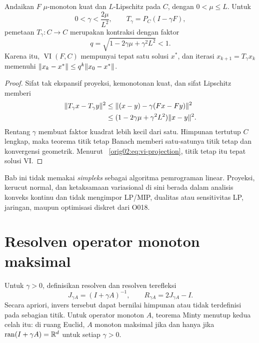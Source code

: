 \begin{theorem}
  \label{orig02:theorem:vi-contraction}
  Andaikan $F$ $\mu$-monoton kuat dan $L$-Lipschitz pada $C$, dengan
  $0<\mu\leq L$. Untuk
  \begin{equation}
    0<\gamma<\frac{2\mu}{L^2},
    \qquad
    T_\gamma=P_C(I-\gamma F),
  \end{equation}
  pemetaan $T_\gamma:C\to C$ merupakan kontraksi dengan faktor
  \begin{equation}
    \label{orig02:eq:vi-contraction-factor}
    q=\sqrt{1-2\gamma\mu+\gamma^2L^2}<1.
  \end{equation}
  Karena itu, $\operatorname{VI}(F,C)$ mempunyai tepat satu solusi $x^*$,
  dan iterasi $x_{k+1}=T_\gamma x_k$ memenuhi
  $\|x_k-x^*\|\leq q^k\|x_0-x^*\|$.
\end{theorem}
\begin{proof}
  Sifat tak ekspansif proyeksi, kemonotonan kuat, dan sifat Lipschitz memberi
  \begin{equation}
  \begin{aligned}
    \|T_\gamma x-T_\gamma y\|^2
    &\leq\|(x-y)-\gamma(Fx-Fy)\|^2\\
    &\leq(1-2\gamma\mu+\gamma^2L^2)\|x-y\|^2.
  \end{aligned}
  \end{equation}
  Rentang $\gamma$ membuat faktor kuadrat lebih kecil dari satu. Himpunan
  tertutup $C$ lengkap, maka teorema titik tetap Banach memberi satu-satunya
  titik tetap dan konvergensi geometrik. Menurut
  ~\eqref{orig02:eq:vi-projection}, titik tetap itu tepat solusi VI.
\end{proof}

Bab ini tidak memakai \emph{simpleks} sebagai algoritma pemrograman linear.
Proyeksi, kerucut normal, dan ketaksamaan variasional di sini berada dalam
analisis konveks kontinu dan tidak mengimpor LP/MIP, dualitas atau sensitivitas
LP, jaringan, maupun optimisasi diskret dari O018.

\section{Resolven operator monoton maksimal}
\label{orig02:section:resolvent}

Untuk $\gamma>0$, definisikan resolven dan resolven terefleksi
\begin{equation}
  \label{orig02:eq:resolvent-definition}
  J_{\gamma A}=(I+\gamma A)^{-1},
  \qquad
  R_{\gamma A}=2J_{\gamma A}-I.
\end{equation}
Secara apriori, invers tersebut dapat bernilai himpunan atau tidak terdefinisi
pada sebagian titik. Untuk operator monoton $A$, teorema Minty menutup kedua
celah itu: di ruang Euclid, $A$ monoton maksimal jika dan hanya jika
$\operatorname{ran}(I+\gamma A)=\mathbb{R}^d$ untuk setiap $\gamma>0$.

